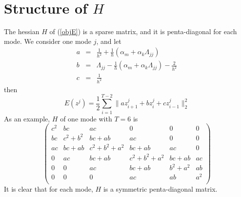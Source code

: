 \documentclass[9pt,twocolumn]{extarticle}
\begin{document}
\appendix
\section{Structure of $H$}
The hessian $H$ of (\ref{objE}) is a sparse matrix, and it is penta-diagonal for
each mode. We consider one mode $j$, and let
\begin{eqnarray}\label{abc}
  a &=& \frac{1}{h^2}+\frac{1}{h}(\alpha_m+\alpha_k\Lambda_{jj})\\
  b &=& \Lambda_{jj}-\frac{1}{h}(\alpha_m+\alpha_k\Lambda_{jj})-\frac{2}{h^2}\\
  c &=& \frac{1}{h^2}
\end{eqnarray}
then
\begin{equation} \label{}
  E(z^j) = \frac{1}{2}\sum_{i=1}^{T-2}\|az^j_{i+1}+bz^j_{i}+cz^j_{i-1}\|_2^2
\end{equation}
As an example, $H$ of one mode with $T=6$ is
\[
\left( \begin{array}{ccccccc}
    c^2&bc&ac&0&0&0\\
    bc&c^2+b^2&bc+ab&ac&0&0\\
    ac&bc+ab&c^2+b^2+a^2&bc+ab&ac&0\\
    0&ac&bc+ab&c^2+b^2+a^2&bc+ab&ac\\
    0&0&ac&bc+ab&b^2+a^2&ab\\
    0&0&0&ac&ab&a^2\\
  \end{array} \right)
\]
It is clear that for each mode, $H$ is a symmetric penta-diagonal matrix.

\end{document}
